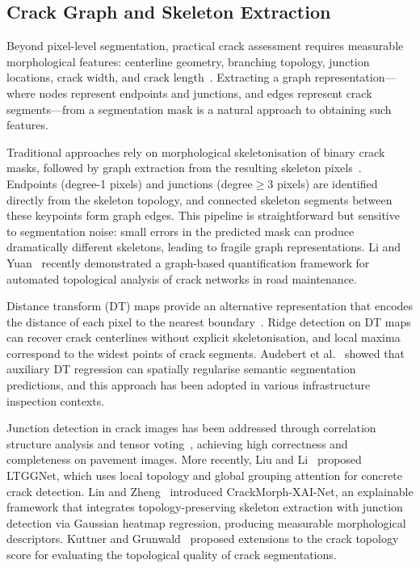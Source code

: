 \documentclass[preprint,12pt]{elsarticle}
\begin{document}
\subsection{Crack Graph and Skeleton Extraction}
\label{sec:rw_graph}

Beyond pixel-level segmentation, practical crack assessment requires measurable morphological features: centerline geometry, branching topology, junction locations, crack width, and crack length~\cite{li2024crackquantification, lin2025crackmorph}. Extracting a graph representation---where nodes represent endpoints and junctions, and edges represent crack segments---from a segmentation mask is a natural approach to obtaining such features.

Traditional approaches rely on morphological skeletonisation of binary crack masks, followed by graph extraction from the resulting skeleton pixels~\cite{wang2025crackskeletonization}. Endpoints (degree-1 pixels) and junctions (degree$\geq$3 pixels) are identified directly from the skeleton topology, and connected skeleton segments between these keypoints form graph edges. This pipeline is straightforward but sensitive to segmentation noise: small errors in the predicted mask can produce dramatically different skeletons, leading to fragile graph representations. Li and Yuan~\cite{li2025cracktopology} recently demonstrated a graph-based quantification framework for automated topological analysis of crack networks in road maintenance.

Distance transform (DT) maps provide an alternative representation that encodes the distance of each pixel to the nearest boundary~\cite{audebert2019distance}. Ridge detection on DT maps can recover crack centerlines without explicit skeletonisation, and local maxima correspond to the widest points of crack segments. Audebert et al.~\cite{audebert2019distance} showed that auxiliary DT regression can spatially regularise semantic segmentation predictions, and this approach has been adopted in various infrastructure inspection contexts.

Junction detection in crack images has been addressed through correlation structure analysis and tensor voting~\cite{sun2019crackjunction}, achieving high correctness and completeness on pavement images. More recently, Liu and Li~\cite{liu2024ltggnet} proposed LTGGNet, which uses local topology and global grouping attention for concrete crack detection. Lin and Zheng~\cite{lin2025crackmorph} introduced CrackMorph-XAI-Net, an explainable framework that integrates topology-preserving skeleton extraction with junction detection via Gaussian heatmap regression, producing measurable morphological descriptors. Kuttner and Grunwald~\cite{kuttner2025cracktopo} proposed extensions to the crack topology score for evaluating the topological quality of crack segmentations.
\end{document}
